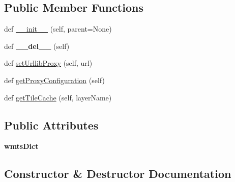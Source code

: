 \subsection*{Public Member Functions}
\begin{DoxyCompactItemize}
\item 
def \mbox{\hyperlink{class_dsg_tools_1_1_b_d_g_ex_tools_1_1_b_d_g_ex_tools_1_1_b_d_g_ex_tools_af5cd1fec5d3d76c481a15684129d5087}{\+\_\+\+\_\+init\+\_\+\+\_\+}} (self, parent=None)
\item 
\mbox{\label{class_dsg_tools_1_1_b_d_g_ex_tools_1_1_b_d_g_ex_tools_1_1_b_d_g_ex_tools_ad4c69b5f873e593bf0d2fa9fcc250cfc}} 
def {\bfseries \+\_\+\+\_\+del\+\_\+\+\_\+} (self)
\item 
def \mbox{\hyperlink{class_dsg_tools_1_1_b_d_g_ex_tools_1_1_b_d_g_ex_tools_1_1_b_d_g_ex_tools_a4aa1b6400c85244c9e1e58f2db6dd5b0}{set\+Urllib\+Proxy}} (self, url)
\item 
def \mbox{\hyperlink{class_dsg_tools_1_1_b_d_g_ex_tools_1_1_b_d_g_ex_tools_1_1_b_d_g_ex_tools_ae1d1739583479694ce91110fccd2acb2}{get\+Proxy\+Configuration}} (self)
\item 
def \mbox{\hyperlink{class_dsg_tools_1_1_b_d_g_ex_tools_1_1_b_d_g_ex_tools_1_1_b_d_g_ex_tools_ab459fa07b2e293f9a1bc21dcceb6c6ff}{get\+Tile\+Cache}} (self, layer\+Name)
\end{DoxyCompactItemize}
\subsection*{Public Attributes}
\begin{DoxyCompactItemize}
\item 
\mbox{\label{class_dsg_tools_1_1_b_d_g_ex_tools_1_1_b_d_g_ex_tools_1_1_b_d_g_ex_tools_ae9ac9129cdda84d010e8245690f8ea5b}} 
{\bfseries wmts\+Dict}
\end{DoxyCompactItemize}


\subsection{Constructor \& Destructor Documentation}
\mbox{\label{class_dsg_tools_1_1_b_d_g_ex_tools_1_1_b_d_g_ex_tools_1_1_b_d_g_ex_tools_af5cd1fec5d3d76c481a15684129d5087}} 
